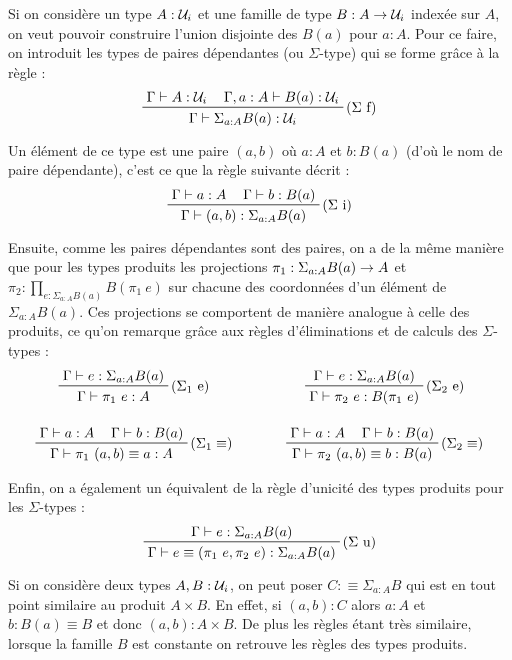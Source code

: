 \documentclass[../../rapport.tex]{subfiles}
\begin{document}
  Si on considère un type $A : \mathcal U_i$ et une famille de type $B : A \rightarrow \mathcal U_i$ indexée sur $A$,
  on veut pouvoir construire l'union disjointe des $B(a)$ pour $a : A$.
  Pour ce faire, on introduit les types de paires dépendantes (ou $\Sigma$-type) qui se forme grâce à la règle :
  $$
  \prfinterspace=1.2em
  \prftree[r]{($\Sigma$ f)}
    {\Gamma \vdash A : \U_i}
    {\Gamma, a : A \vdash B(a) : \U_i}
  {\Gamma \vdash \Sigma_{a : A}B(a) : \U_i}
  $$

  Un élément de ce type est une paire $(a, b)$ où $a : A$ et $b : B(a)$ (d'où le nom de paire dépendante),
  c'est ce que la règle suivante décrit :
  $$\prfinterspace=1.2em
  \prftree[r]{($\Sigma$ i)}
    {\Gamma \vdash a : A}
    {\Gamma \vdash b : B(a)}
  {\Gamma \vdash (a, b) : \Sigma_{a:A}B(a)}
  $$

  Ensuite, comme les paires dépendantes sont des paires, on a de la même manière que pour les types produits les projections
  $\pi_1 : \Sigma_{a:A}B(a) \rightarrow A$ et $\pi_2 : \prod_{e : \Sigma_{a:A}B(a)}B(\pi_1\ e)$ sur chacune des coordonnées d'un élément
  de $\Sigma_{a:A}B(a)$.
  Ces projections se comportent de manière analogue à celle des produits, ce qu'on remarque grâce aux règles d'éliminations et de calculs
  des $\Sigma$-types :
  $$
  \prfinterspace=1.2em
  \begin{array}{cc}
    \prftree[r]{($\Sigma_1$ e)}
      {\Gamma \vdash e : \Sigma_{a:A}B(a)}
      {\Gamma \vdash \pi_1\ e : A}
    \hspace{1cm} &
    \prftree[r]{($\Sigma_2$ e)}
      {\Gamma \vdash e : \Sigma_{a:A}B(a)}
      {\Gamma \vdash \pi_2\ e : B(\pi_1\ e)}
    \vspace{1.5em} \\
    \prftree[r]{($\Sigma_1 \equiv$)}
      {\Gamma \vdash a : A}
      {\Gamma \vdash b : B(a)}
      {\Gamma \vdash \pi_1\ (a, b) \equiv a : A}
    \hspace{1cm} &
    \prftree[r]{($\Sigma_2 \equiv$)}
      {\Gamma \vdash a : A}
      {\Gamma \vdash b : B(a)}
      {\Gamma \vdash \pi_2\ (a, b) \equiv b : B(a)}
  \end{array}
  $$

  Enfin, on a également un équivalent de la règle d'unicité des types produits pour les $\Sigma$-types :
  $$
  \prfinterspace=1.2em
  \prftree[r]{($\Sigma$ u)}
    {\Gamma \vdash e : \Sigma_{a:A}B(a)}
    {\Gamma \vdash e \equiv (\pi_1\ e, \pi_2\ e) : \Sigma_{a:A}B(a)}
  $$

  \begin{example}
    Si on considère deux types $A, B : \mathcal U_i$, on peut poser $C :\equiv \Sigma_{a:A}B$ qui est en tout point similaire au produit $A \times B$.
    En effet, si $(a, b) : C$ alors $a: A$ et $b : B(a) \equiv B$ et donc $(a, b) : A \times B$.
    De plus les règles étant très similaire, lorsque la famille $B$ est constante on retrouve les règles des types produits.
  \end{example}
\end{document}
